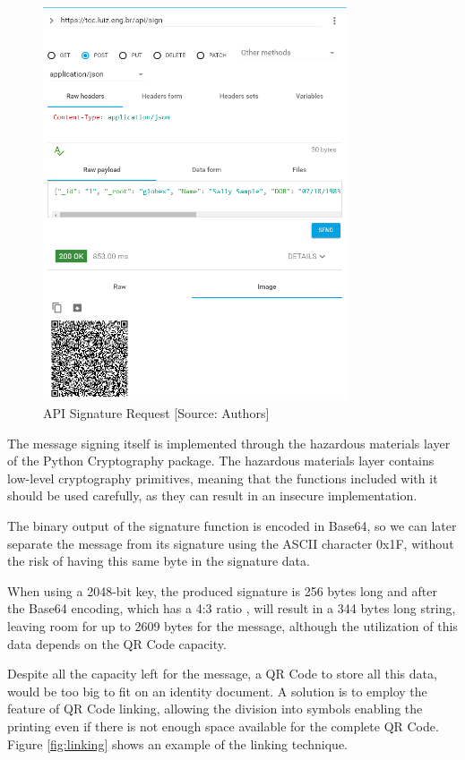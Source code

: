 \documentclass[12pt]{article}
\begin{document}
\begin{figure}[H]
    \centering
    \includegraphics[width=0.8\textwidth]{api.png}
    \caption{API Signature Request [Source: Authors]}
    \label{fig:api}
\end{figure}

The message signing itself is implemented through the hazardous materials layer of the Python Cryptography \cite{python_cryptography} package. The hazardous materials layer contains low-level cryptography primitives, meaning that the functions included with it should be used carefully, as they can result in an insecure implementation.

The binary output of the signature function is encoded in Base64, so we can later separate the message from its signature using the ASCII character 0x1F, without the risk of having this same byte in the signature data.

When using a 2048-bit key, the produced signature is 256 bytes long and after the Base64 encoding, which has a 4:3 ratio \cite{josefsson2006base16}, will result in a 344 bytes long string, leaving room for up to 2609 bytes for the message, although the utilization of this data depends on the QR Code capacity.

Despite all the capacity left for the message, a QR Code to store all this data, would be too big to fit on an identity document. A solution is to employ the feature of QR Code linking, allowing the division into symbols enabling the printing even if there is not enough space available for the complete QR Code. Figure \ref{fig:linking} shows an example of the linking technique.
\end{document}
